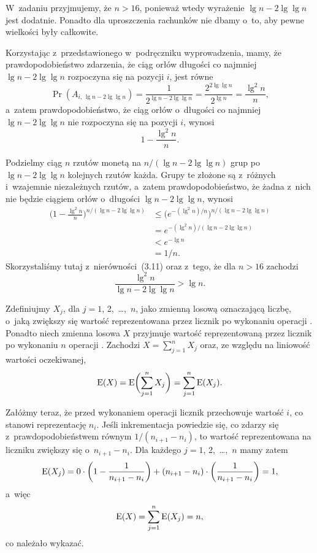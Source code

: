 \exercise %
W~zadaniu przyjmujemy, że $n>16$, ponieważ wtedy wyrażenie $\lg n-2\lg\lg n$ jest dodatnie. Ponadto dla uproszczenia rachunków nie dbamy o~to, aby pewne wielkości były całkowite.

Korzystając z~przedstawionego w~podręczniku wyprowadzenia, mamy, że prawdopodobieństwo zdarzenia, że ciąg orłów długości co najmniej $\lg n-2\lg\lg n$ rozpoczyna się na pozycji $i$, jest równe
\[
	\Pr(A_{i,\,\lg n-2\lg\lg n}) = \frac{1}{2^{\lg n-2\lg\lg n}} = \frac{2^{2\lg\lg n}}{2^{\lg n}} = \frac{\lg^2n}{n},
\]
a~zatem prawdopodobieństwo, że ciąg orłów o~długości co najmniej $\lg n-2\lg\lg n$ nie rozpoczyna się na pozycji $i$, wynosi
\[
	1-\frac{\lg^2n}{n}.
\]

Podzielmy ciąg $n$ rzutów monetą na $n/(\lg n-2\lg\lg n)$ grup po $\lg n-2\lg\lg n$ kolejnych rzutów każda. Grupy te złożone są z~różnych i~wzajemnie niezależnych rzutów, a~zatem prawdopodobieństwo, że żadna z~nich nie będzie ciągiem orłów o~długości $\lg n-2\lg\lg n$, wynosi
\begin{align*}
	\biggl(1-\frac{\lg^2n}{n}\biggr)^{n/(\lg n-2\lg\lg n)} &\le \bigl(e^{-(\lg^2n)/n}\bigr)^{n/(\lg n-2\lg\lg n)} \\
	&= e^{-(\lg^2n)/(\lg n-2\lg\lg n)} \\
	&< e^{-\lg n} \\
	&= 1/n.
\end{align*}
Skorzystaliśmy tutaj z~nierówności~(3.11) oraz z~tego, że dla $n>16$ zachodzi
\[
	\frac{\lg^2n}{\lg n-2\lg\lg n} > \lg n.
\]

\problems


\subproblem %
Zdefiniujmy $X_j$, dla $j=1$, 2,~\dots,~$n$, jako zmienną losową oznaczającą liczbę, o~jaką zwiększy się wartość reprezentowana przez licznik po  wykonaniu operacji . Ponadto niech zmienna losowa $X$ przyjmuje wartość reprezentowaną przez licznik po wykonaniu $n$ operacji . Zachodzi $X=\sum_{j=1}^nX_j$ oraz, ze względu na liniowość wartości oczekiwanej,
\[
	\operatorname{E}(X) = \operatorname{E}\biggl(\sum_{j=1}^nX_j\biggr) = \sum_{j=1}^n\operatorname{E}(X_j).
\]

Załóżmy teraz, że przed wykonaniem  operacji  licznik przechowuje wartość $i$, co stanowi reprezentację $n_i$. Jeśli inkrementacja powiedzie się, co zdarzy się z~prawdopodobieństwem równym $1/(n_{i+1}-n_i)$, to wartość reprezentowana na liczniku zwiększy się o~$n_{i+1}-n_i$. Dla każdego $j=1$, 2,~\dots,~$n$ mamy zatem
\[
	\operatorname{E}(X_j) = 0\cdot\biggl(1-\frac{1}{n_{i+1}-n_i}\biggr)+(n_{i+1}-n_i)\cdot\biggl(\frac{1}{n_{i+1}-n_i}\biggr) = 1,
\]
a~więc
\[
	\operatorname{E}(X) = \sum_{j=1}^n\operatorname{E}(X_j) = n,
\]
co należało wykazać.

